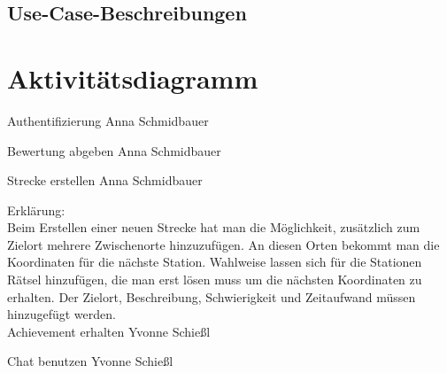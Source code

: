 \documentclass[a4paper, 12pt]{article}
\begin{document}
\subsection{Use-Case-Beschreibungen}
\section{Aktivitätsdiagramm}

{\Large Authentifizierung}
Anna Schmidbauer
\begin{figure}[H] 
\centering
	\fbox{\begin{minipage}{16cm} 
	\end{minipage}}
\end{figure}


{\Large Bewertung abgeben}
Anna Schmidbauer
\begin{figure}[H] 
\centering
	\fbox{\begin{minipage}{16cm} 
	\end{minipage}}
\end{figure}

{\Large Strecke erstellen}
Anna Schmidbauer
\begin{figure}[H] 
\centering
	\fbox{\begin{minipage}{16cm} 
	\end{minipage}}
\end{figure}

Erklärung:\\
Beim Erstellen einer neuen Strecke hat man die Möglichkeit, zusätzlich zum Zielort mehrere Zwischenorte hinzuzufügen. An diesen Orten bekommt man die Koordinaten für die nächste Station. Wahlweise lassen sich für die Stationen Rätsel hinzufügen, die man erst lösen muss um die nächsten Koordinaten zu erhalten. Der Zielort, Beschreibung, Schwierigkeit und Zeitaufwand müssen hinzugefügt werden.\\

{\Large Achievement erhalten}
Yvonne Schießl
\begin{figure}[H] 
\centering
	\fbox{\begin{minipage}{16cm} 
	\end{minipage}}
\end{figure}

{\Large Chat benutzen}
Yvonne Schießl
\begin{figure}[H] 
\centering
	\fbox{\begin{minipage}{16cm} 
	\end{minipage}}
\end{figure}
\end{document}
